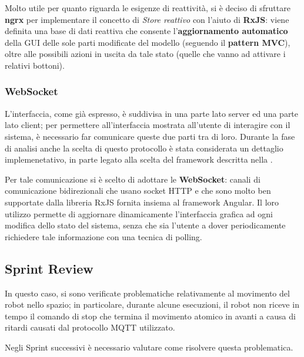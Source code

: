 Molto utile per quanto riguarda le esigenze di reattività, si è deciso di sfruttare \textbf{ngrx} per implementare il concetto di \textit{Store reattivo} con l'aiuto di \textbf{RxJS}:
viene definita una base di dati reattiva che consente l'\textbf{aggiornamento automatico} della GUI delle sole parti modificate del modello (seguendo il \textbf{pattern MVC}), oltre alle possibili azioni in uscita da tale stato (quelle che vanno ad attivare i relativi bottoni).

\subsubsection{WebSocket}

L'interfaccia, come già espresso, è suddivisa in una parte lato server ed una parte lato client;
per permettere all'interfaccia mostrata all'utente di interagire con il sistema, è necessario far comunicare queste due parti tra di loro.
Durante la fase di analisi anche la scelta di questo protocollo è stata considerata un dettaglio implemenetativo, in parte legato alla scelta del framework descritta nella .

Per tale comunicazione si è scelto di adottare le \textbf{WebSocket}:
canali di comunicazione bidirezionali che usano socket HTTP e che sono molto ben supportate dalla libreria RxJS fornita insiema al framework Angular.
Il loro utilizzo permette di aggiornare dinamicamente l'interfaccia grafica ad ogni modifica dello stato del sistema, senza che sia l'utente a dover periodicamente richiedere tale informazione con una tecnica di polling.

\subsection{Sprint Review}

In questo caso, si sono verificate problematiche relativamente al movimento del robot nello spazio;
in particolare, durante alcune esecuzioni, il robot non riceve in tempo il comando di stop che termina il movimento atomico in avanti a causa di ritardi causati dal protocollo MQTT utilizzato.

Negli Sprint successivi è necessario valutare come risolvere questa problematica.
